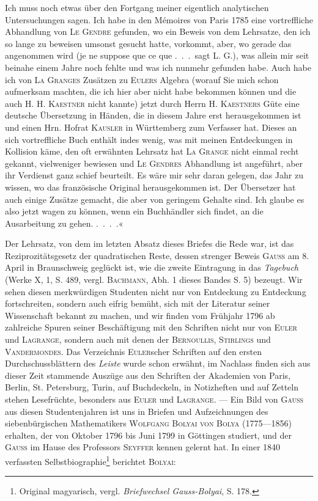 Ich muss noch etwas über den Fortgang meiner eigentlich analytischen
Untersuchungen sagen. Ich habe in den Mémoires von Paris 1785 eine vortreffliche
Abhandlung von \textsc{Le Gendre} gefunden, wo ein Beweis von dem Lehrsatze,
den ich so lange  zu beweisen umsonst gesucht hatte,
vorkommt, aber, wo gerade das angenommen wird (je ne suppose que ce que
.\ .\ .\ sagt L. G.), was allein mir seit beinahe einem Jahre noch fehlte und
was ich nunmehr gefunden habe. Auch habe ich von \textsc{La Granges} Zusätzen
zu \textsc{Eulers} Algebra (worauf Sie mich schon aufmerksam machten, die ich hier
aber nicht habe bekommen können und die auch H. H. \textsc{Kaestner} nicht kannte)
jetzt durch Herrn H. \textsc{Kaestners} Güte eine deutsche Übersetzung in Händen,
die in diesem Jahre erst herausgekommen ist und einen Hrn. Hofrat \textsc{Kausler}
in Württemberg zum Verfasser hat. Dieses an sich vortreffliche Buch enthält
indes wenig, was mit meinen Entdeckungen in Kollision käme, den oft erwähnten
Lehrsatz hat \textsc{La Grange} nicht einmal recht gekannt, vielweniger
bewiesen und \textsc{Le Gendres} Abhandlung ist angeführt, aber ihr Verdienst ganz
schief beurteilt. Es wäre mir sehr daran gelegen, das Jahr zu wissen, wo das
französische Original herausgekommen ist. Der Übersetzer hat auch einige
Zusätze gemacht, die aber von geringem Gehalte sind. Ich glaube es also
jetzt wagen zu können, wenn ein Buchhändler sich findet, an die Ausarbeitung
zu gehen. .\ .\ .\ .«

\clearpage{}
Der Lehrsatz, von dem im letzten Absatz dieses Briefes die Rede war,
ist das Reziprozitätsgesetz der quadratischen Reste, dessen strenger Beweis
\textsc{Gauss} am 8. April in Braunschweig geglückt ist, wie die zweite Eintragung
in das \textit{Tagebuch} (Werke X, 1, S. 489, vergl. \textsc{Bachmann}, Abh. 1 dieses Bandes
S. 5) bezeugt. Wir sehen diesen merkwürdigen Studenten nicht nur von Entdeckung
zu Entdeckung fortschreiten, sondern auch eifrig bemüht, sich mit
der Literatur seiner Wissenschaft bekannt zu machen, und wir finden vom
Frühjahr 1796 ab zahlreiche Spuren seiner Beschäftigung mit den Schriften
nicht nur von \textsc{Euler} und \textsc{Lagrange}, sondern auch mit denen der \textsc{Bernoullis},
\textsc{Stirlings} und \textsc{Vandermondes}. Das Verzeichnis \textsc{Euler}scher Schriften auf den
ersten Durchschussblättern des \textit{Leiste} wurde schon erwähnt, im Nachlass finden
sich aus dieser Zeit stammende Auszüge aus den Schriften der Akademien
von Paris, Berlin, St. Petersburg, Turin, auf Buchdeckeln, in Notizheften und
auf Zetteln stehen Lesefrüchte, besonders aus \textsc{Euler} und \textsc{Lagrange}. — Ein
Bild von \textsc{Gauss} aus diesen Studentenjahren ist uns in Briefen und Aufzeichnungen
des siebenbürgischen Mathematikers \textsc{Wolfgang Bolyai von Bolya}
(1775—1856) erhalten, der von Oktober 1796 bis Juni 1799 in Göttingen
studiert, und der \textsc{Gauss} im Hause des Professors \textsc{Seyffer} kennen gelernt hat.
In einer 1840 verfassten Selbstbiographie\footnote{Original magyarisch, vergl. \textit{Briefwechsel Gauss-Bolyai}, S. 178.} berichtet \textsc{Bolyai}:

